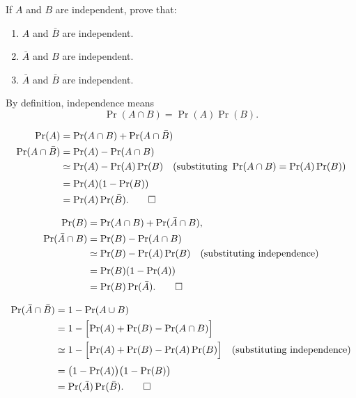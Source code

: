 \begin{hwkProblem}{6}{}
	If \(A\) and \(B\) are independent, prove that:
	\begin{enumerate}
		\item \(A\) and \(\bar{B}\) are independent.
		\item \(\bar{A}\) and \(B\) are independent.
		\item \(\bar{A}\) and \(\bar{B}\) are independent.
	\end{enumerate}

	\hwkSol

	By definition, independence means 
	\[
		\Pr(A\cap B)=\Pr(A)\Pr(B).
	\]

	\hwkPart

	\begin{align*}
		\Pr(A) &= \Pr(A\cap B)+\Pr(A\cap \bar{B}) \\
		\Pr(A\cap \bar{B}) &= \Pr(A)-\Pr(A\cap B) \\
				   &\simeq \Pr(A) - \Pr(A)\Pr(B) \quad (\text{substituting } \Pr(A\cap B)=\Pr(A)\Pr(B))\\[1mm]
				   &= \Pr(A)(1-\Pr(B)) \\
				   &= \Pr(A)\Pr(\bar{B}). \qed
	\end{align*}

	\hwkPart

	\begin{align*}
		\Pr(B) &= \Pr(A\cap B)+\Pr(\bar{A}\cap B), \\
		\Pr(\bar{A}\cap B) &= \Pr(B) - \Pr(A\cap B) \\
				   &\simeq \Pr(B) - \Pr(A)\Pr(B) \quad (\text{substituting independence})\\[1mm]
				   &= \Pr(B)(1-\Pr(A)) \\
				   &= \Pr(B)\Pr(\bar{A}). \qed
	\end{align*}

	\hwkPart

	\begin{align*}
		\Pr(\bar{A}\cap \bar{B}) 
		&= 1-\Pr(A\cup B) \\
		&= 1-\Bigl[\Pr(A)+\Pr(B)-\Pr(A\cap B)\Bigr] \\
		&\simeq 1-\Bigl[\Pr(A)+\Pr(B)-\Pr(A)\Pr(B)\Bigr] \quad (\text{substituting independence})\\[1mm]
		&= \bigl(1-\Pr(A)\bigr)\bigl(1-\Pr(B)\bigr) \\
		&= \Pr(\bar{A})\Pr(\bar{B}). \qed
	\end{align*}

\end{hwkProblem}

